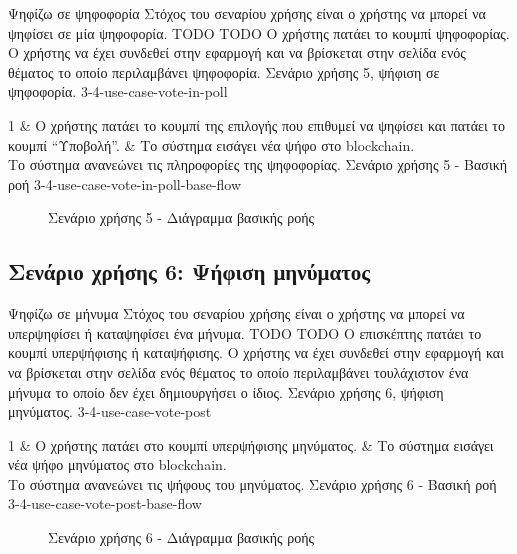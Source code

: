 \useCaseTable
{Ψηφίζω σε ψηφοφορία}
{Στόχος του σεναρίου χρήσης είναι ο χρήστης να μπορεί να ψηφίσει σε μία ψηφοφορία.}
{TODO}
{TODO}
{Ο χρήστης πατάει το κουμπί ψηφοφορίας.}
{Ο χρήστης να έχει συνδεθεί στην εφαρμογή και να βρίσκεται στην σελίδα ενός θέματος το οποίο περιλαμβάνει ψηφοφορία.}
{Σενάριο χρήσης 5, ψήφιση σε ψηφοφορία.}
{3-4-use-case-vote-in-poll}

\useCaseBaseFlowTable
{
    1 & Ο χρήστης πατάει το κουμπί της επιλογής που επιθυμεί να ψηφίσει και πατάει το κουμπί ``Υποβολή''. & Το σύστημα εισάγει νέα ψήφο στο blockchain. \\ [0.5ex]
}
{Το σύστημα ανανεώνει τις πληροφορίες της ψηφοφορίας.}
{Σενάριο χρήσης 5 - Βασική ροή}
{3-4-use-case-vote-in-poll-base-flow}

\begin{figure}[H]
    \centering
    
    \caption{Σενάριο χρήσης 5 - Διάγραμμα βασικής ροής}
    \label{figure:3-4-use-case-vote-in-poll-base-flow-sequence-diagram}
\end{figure}

\subsection{Σενάριο χρήσης 6: Ψήφιση μηνύματος} \label{subsection:3-4-use-case-vote-post}

\useCaseTable
{Ψηφίζω σε μήνυμα}
{Στόχος του σεναρίου χρήσης είναι ο χρήστης να μπορεί να υπερψηφίσει ή καταψηφίσει ένα μήνυμα.}
{TODO}
{TODO}
{Ο επισκέπτης πατάει το κουμπί υπερψήφισης ή καταψήφισης.}
{Ο χρήστης να έχει συνδεθεί στην εφαρμογή και να βρίσκεται στην σελίδα ενός θέματος το οποίο περιλαμβάνει τουλάχιστον ένα μήνυμα το οποίο δεν έχει δημιουργήσει ο ίδιος.}
{Σενάριο χρήσης 6, ψήφιση μηνύματος.}
{3-4-use-case-vote-post}

\useCaseBaseFlowTable
{
    1 & Ο χρήστης πατάει στο κουμπί υπερψήφισης μηνύματος. & Το σύστημα εισάγει νέα ψήφο μηνύματος στο blockchain. \\ [0.5ex]
}
{Το σύστημα ανανεώνει τις ψήφους του μηνύματος.}
{Σενάριο χρήσης 6 - Βασική ροή}
{3-4-use-case-vote-post-base-flow}

\begin{figure}[H]
    \centering
    
    \caption{Σενάριο χρήσης 6 - Διάγραμμα βασικής ροής}
    \label{figure:3-4-use-case-vote-post-base-flow-sequence-diagram}
\end{figure}
